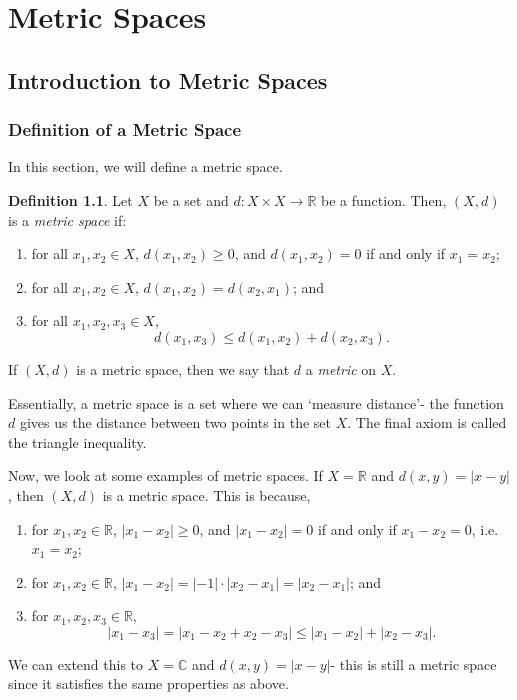 \documentclass[a4paper, openany]{memoir}
\theoremstyle{definition}
\newtheorem{definition}{Definition}[section]
\theoremstyle{plain}
\begin{document}
\chapter{Metric Spaces}
\section{Introduction to Metric Spaces}
\subsection{Definition of a Metric Space}
In this section, we will define a metric space.
\begin{definition}
Let $X$ be a set and $d: X \times X \to \mathbb{R}$ be a function. Then, $(X, d)$ is a \emph{metric space} if:
\begin{enumerate}[label=\textbf{M\arabic*}.]
    \item for all $x_1, x_2 \in X$, $d(x_1, x_2) \geqslant 0$, and $d(x_1, x_2) = 0$ if and only if $x_1 = x_2$; 
    \item for all $x_1, x_2 \in X$, $d(x_1, x_2) = d(x_2, x_1)$; and
    \item for all $x_1, x_2, x_3 \in X$,
    \[d(x_1, x_3) \leqslant d(x_1, x_2) + d(x_2, x_3).\]
\end{enumerate}
If $(X, d)$ is a metric space, then we say that $d$ a \emph{metric} on $X$.
\end{definition}
\noindent Essentially, a metric space is a set where we can `measure distance'- the function $d$ gives us the distance between two points in the set $X$. The final axiom is called the triangle inequality.

Now, we look at some examples of metric spaces. If $X = \mathbb{R}$ and $d(x, y) = |x - y|$, then $(X, d)$ is a metric space. This is because, 
\begin{enumerate}[label=\textbf{M\arabic*}.]
    \item for $x_1, x_2 \in \mathbb{R}$, $|x_1 - x_2| \geqslant 0$, and $|x_1 - x_2| = 0$ if and only if $x_1 - x_2 = 0$, i.e. $x_1 = x_2$;
    \item for $x_1, x_2 \in \mathbb{R}$, $|x_1 - x_2| = |-1| \cdot |x_2 - x_1| = |x_2 - x_1|$; and
    \item for $x_1, x_2, x_3 \in \mathbb{R}$, 
    \[|x_1 - x_3| = |x_1 - x_2 + x_2 - x_3| \leqslant |x_1 - x_2| + |x_2 - x_3|.\]
\end{enumerate}
\noindent We can extend this to $X = \mathbb{C}$ and $d(x, y) = |x - y|$- this is still a metric space since it satisfies the same properties as above.
\end{document}
